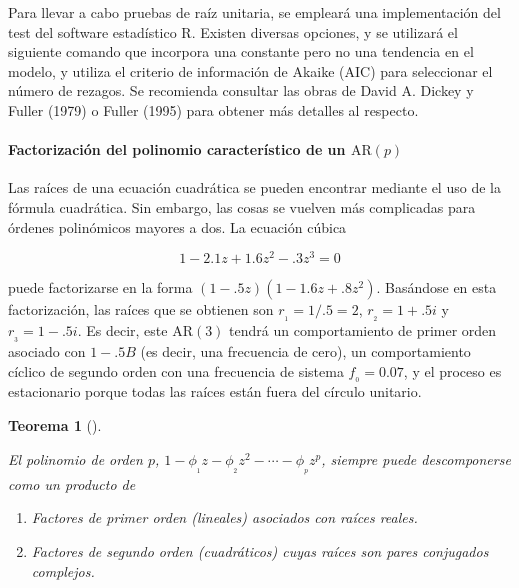 \documentclass[
  us-letterpaper,
]{scrreprt}
\let\oldparagraph\paragraph
\renewcommand{\paragraph}[1]{\oldparagraph{#1}\mbox{}}
\theoremstyle{plain}
\theoremstyle{definition}
\theoremstyle{definition}
\theoremstyle{plain}
\newtheorem{theorem}{Teorema}[chapter]
\theoremstyle{remark}
\begin{document}
Para llevar a cabo pruebas de raíz unitaria, se empleará una
implementación del test del software estadístico R. Existen diversas
opciones, y se utilizará el siguiente comando que incorpora una
constante pero no una tendencia en el modelo, y utiliza el criterio de
información de Akaike (AIC) para seleccionar el número de rezagos. Se
recomienda consultar las obras de David A. Dickey y Fuller (1979) o
Fuller (1995) para obtener más detalles al respecto.

\paragraph{\texorpdfstring{Factorización del polinomio característico de
un
\(\mathrm{AR}(p)\)}{Factorización del polinomio característico de un \textbackslash mathrm\{AR\}(p)}}\label{factorizaciuxf3n-del-polinomio-caracteruxedstico-de-un-mathrmarp}

Las raíces de una ecuación cuadrática se pueden encontrar mediante el
uso de la fórmula cuadrática. Sin embargo, las cosas se vuelven más
complicadas para órdenes polinómicos mayores a dos. La ecuación cúbica

\[
1-2.1z+1.6z^2-.3z^3=0
\]

puede factorizarse en la forma \((1-.5z)(1-1.6z+.8z^2)\). Basándose en
esta factorización, las raíces que se obtienen son \(r_{_1} = 1/.5=2\),
\(r_{_2} = 1+.5i\) y \(r_{_3} = 1-.5i\). Es decir, este
\(\mathrm{AR}(3)\) tendrá un comportamiento de primer orden asociado con
\(1-.5B\) (es decir, una frecuencia de cero), un comportamiento cíclico
de segundo orden con una frecuencia de sistema \(f_{_0} = 0.07\), y el
proceso es estacionario porque todas las raíces están fuera del círculo
unitario.

\begin{theorem}[]\protect\hypertarget{thm-poli}{}\label{thm-poli}

El polinomio de orden \(p\),
\(1-\phi_{_1}z-\phi_{_2}z^2-\cdots-\phi_{_p}z^p\), siempre puede
descomponerse como un producto de

\begin{enumerate}
\def\labelenumi{\roman{enumi}.}
\item
  Factores de primer orden (lineales) asociados con raíces reales.
\item
  Factores de segundo orden (cuadráticos) cuyas raíces son pares
  conjugados complejos.
\end{enumerate}

\end{theorem}
\end{document}
